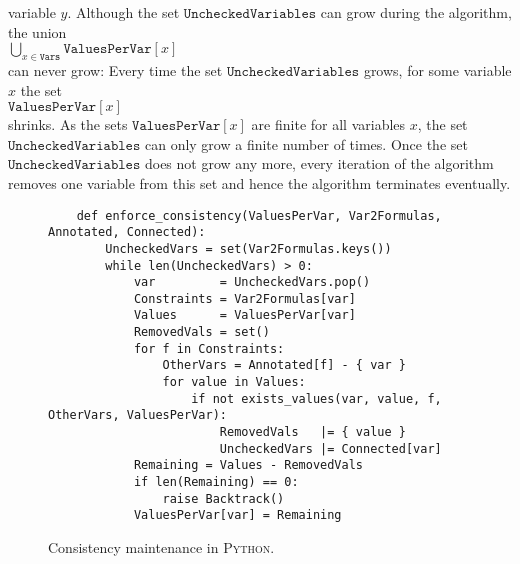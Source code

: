 variable $y$.  Although the set $\texttt{UncheckedVariables}$ can grow during the algorithm,  the union
\\[0.2cm]
\hspace*{1.3cm}
$\bigcup\limits_{x \in \texttt{Vars}} \texttt{ValuesPerVar}[x]$ 
\\[0.2cm]
can never grow:  Every time the set $\texttt{UncheckedVariables}$ grows,
for some variable $x$ the set
\\[0.2cm]
\hspace*{1.3cm}
$\texttt{ValuesPerVar}[x]$ 
\\[0.2cm] 
shrinks.  As the sets $\texttt{ValuesPerVar}[x]$ are finite for all variables $x$, the set
$\texttt{UncheckedVariables}$ can only grow a finite number of times. 
Once the set $\texttt{UncheckedVariables}$ does not grow any more, every iteration of the algorithm removes one
variable from this set and hence the algorithm terminates eventually.

\begin{figure}[!ht]
\centering
\begin{verbatim}
    def enforce_consistency(ValuesPerVar, Var2Formulas, Annotated, Connected):
        UncheckedVars = set(Var2Formulas.keys())
        while len(UncheckedVars) > 0:
            var         = UncheckedVars.pop()
            Constraints = Var2Formulas[var]
            Values      = ValuesPerVar[var]
            RemovedVals = set()
            for f in Constraints:
                OtherVars = Annotated[f] - { var }
                for value in Values:
                    if not exists_values(var, value, f, OtherVars, ValuesPerVar):
                        RemovedVals   |= { value }
                        UncheckedVars |= Connected[var]
            Remaining = Values - RemovedVals
            if len(Remaining) == 0:
                raise Backtrack()
            ValuesPerVar[var] = Remaining
\end{verbatim}
\vspace*{-0.3cm}
\caption{Consistency maintenance in \textsc{Python}.}
\label{fig:Consistency-Solver.ipynb:enforce_consistency}
\end{figure}

